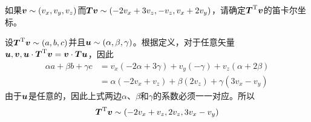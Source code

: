 \begin{example}
    如果$\boldsymbol{v}\sim \left( v_x,v_y,v_z \right) $而$\boldsymbol{Tv}\sim \left( -2v_x+3v_z,-v_z,v_x+2v_y \right) $，请确定$\boldsymbol{T}^{\mathrm{T}}\boldsymbol{v}$的笛卡尔坐标。
\end{example}
\begin{solution}
    设$\boldsymbol{T}^{\mathrm{T}}\boldsymbol{v}\sim \left( a,b,c \right) $并且$\boldsymbol{u}\sim \left( \alpha ,\beta ,\gamma \right) $。根据定义，对于任意矢量$\boldsymbol{u},\boldsymbol{v},\boldsymbol{u}\cdot \boldsymbol{T}^{\mathrm{T}}\boldsymbol{v}=\boldsymbol{v}\cdot \boldsymbol{Tu}$，因此
    \begin{align*}
        \alpha a+\beta b+\gamma c&=v_x\left( -2\alpha +3\gamma \right) +v_y\left( -\gamma \right) +v_z\left( \alpha +2\beta \right)\\
        &=\alpha \left( -2v_x+v_z \right) +\beta \left( 2v_z \right) +\gamma \left( 3v_x-v_y \right)
    \end{align*}
    由于$\boldsymbol{u}$是任意的，因此上式两边$\alpha $、$\beta $和$\gamma$的系数必须一一对应。所以
    \begin{equation*}
        \boldsymbol{T}^{\mathrm{T}}\boldsymbol{v}\sim \left( -2v_x+v_z,2v_z,3v_x-v_y \right) 
    \end{equation*}
\end{solution}